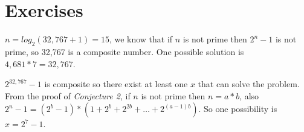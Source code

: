 \section{Exercises}


\sol $n = log_2(32,767+1) = 15$, we know that if $n$ is not prime then $2^n - 1$ is not prime, so 32,767 is a composite number. One possible solution is $4,681 * 7 = 32,767$.


\sol $2^{32,767} - 1$ is composite so there exist at least one $x$ that can solve the problem. From the proof of \textit{Conjecture 2}, if $n$ is not prime then $n = a*b$, also $2^n - 1 = (2^b - 1) * (1 + 2^b + 2^{2b} + \ldots + 2^{(a-1)b})$. So one possibility is $x = 2^7 - 1$.

